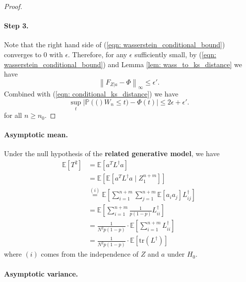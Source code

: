 \documentclass{article}
\newcommand{\Expect}[1]{\mathbb{E}\left[ #1 \right]}
\newcommand{\Prob}[1]{\mathbb{P}\left( #1 \right)}
\newcommand{\norm}[1]{\left\lVert#1\right\rVert}
\newcommand{\abs}[1]{\left \lvert #1 \right \rvert}
\newcommand{\Linv}{L^{\dagger}}
\newcommand{\tr}{\text{tr}}
\theoremstyle{alden}
\theoremstyle{definition}
\theoremstyle{remark}
\begin{document}
\begin{proof}
	\paragraph{Step 3.}
	Note that the right hand side of (\ref{eqn: wasserstein_conditional_bound}) converges to 0 with $\epsilon$. Therefore, for any $\epsilon$ sufficiently small, by (\ref{eqn: wasserstein_conditional_bound}) and Lemma \ref{lem: wass_to_ks_distance} we have
	\begin{equation*}
	\norm{F_{Z | a} - \Phi}_{\infty} \leq \epsilon'.
	\end{equation*}
	Combined with (\ref{eqn: conditional_ks_distance}) we have
	\begin{equation*}
	\sup_{t} \abs{\Prob(W_n \leq t) - \Phi(t)} \leq 2 \epsilon + \epsilon'.
	\end{equation*}
	for all $n \geq n_0$.
	
\end{proof}
\paragraph{Asymptotic mean.}

Under the null hypothesis of the \textbf{related generative model}, we have
\begin{align}
\Expect{T^2} & = \Expect{a^T \Linv a} \nonumber \\
& = \Expect{ \Expect{a^T \Linv a \mid  Z_1^{n+m}} } \nonumber \\
& \overset{(i)}{=} \Expect{ \sum_{i = 1}^{n + m} \sum_{j = 1}^{n + m} \Expect{a_i a_j} \Linv_{ij} } \nonumber \\
& =  \Expect{\sum_{i = 1}^{n + m} \frac{1}{p(1 - p)} \Linv_{ii}} \nonumber \\
& = \frac{1}{N^2 p(1 - p)}\cdot \Expect{\sum_{i = 1}^{n + m} \Linv_{ii} } \nonumber \\
& = \frac{1}{N^2 p(1 - p)} \cdot \Expect{\tr(\Linv)} \label{eqn: asymptotic_expectation}
\end{align}
where $(i)$ comes from the independence of $Z$ and $a$ under $H_0$. 

\paragraph{Asymptotic variance.}
\end{document}
